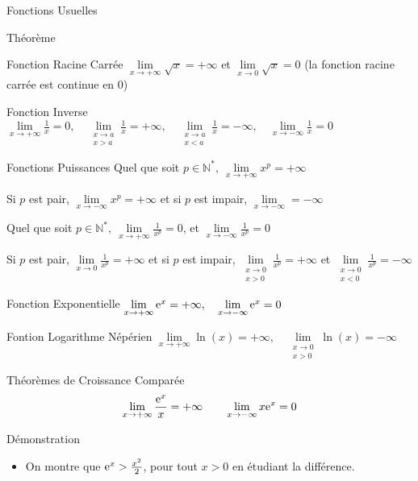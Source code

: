 \documentclass{cours}
\begin{document}
    \begin{Gpartie}{Fonctions Usuelles} 
        \begin{Spartie}{Théorème} 
            \begin{SSpartie}{Fonction Racine Carrée} 
                $\lim\limits_{x\to+\infty}\sqrt{x}=+\infty$ et $\lim\limits_{x\to0}\sqrt{x}=0$ (la fonction racine carrée est continue en $0$)
            \end{SSpartie}
            \begin{SSpartie}{Fonction Inverse} 
                $\lim\limits_{x\to+\infty}\frac{1}{x}=0,\quad\lim\limits_{\substack{x\to a \\ x>a}}\frac{1}{x}=+\infty,\quad\lim\limits_{\substack{x\to a \\ x<a}}\frac{1}{x}=-\infty,\quad\lim\limits_{x\to-\infty}\frac{1}{x}=0$
            \end{SSpartie}
            \begin{SSpartie}{Fonctions Puissances} 
                Quel que soit $p\in\mathbb{N^*},~\lim\limits_{x\to+\infty}x^p=+\infty$

                Si $p$ est pair, $\lim\limits_{x\to-\infty}x^p=+\infty$ et si $p$ est impair, $\lim\limits_{x\to-\infty}=-\infty$
                
                \vspace*{2ex}Quel que soit $p\in\mathbb{N^*},~\lim\limits_{x\to+\infty}\frac{1}{x^p}=0$, et $\lim\limits_{x\to-\infty}\frac{1}{x^p}=0$

                Si $p$ est pair, $\lim\limits_{x\to0}\frac{1}{x^p}=+\infty$ et si $p$ est impair, $\lim\limits_{\substack{x\to0 \\ x>0}}\frac{1}{x^p}=+\infty$ et $\lim\limits_{\substack{x\to0 \\ x<0}}\frac{1}{x^p}=-\infty$
            \end{SSpartie}
            \begin{SSpartie}{Fonction Exponentielle} 
                $\lim\limits_{x\to+\infty}\mathrm{e}^x=+\infty,\quad\lim\limits_{x\to-\infty}\mathrm{e}^x=0$
            \end{SSpartie}
            \begin{SSpartie}{Fontion Logarithme Népérien} 
                $\lim\limits_{x\to+\infty}\ln(x)=+\infty,\quad\lim\limits_{\substack{x\to0 \\ x>0}}\ln(x)=-\infty$
            \end{SSpartie}
        \end{Spartie}
        \begin{Spartie}{Théorèmes de Croissance Comparée} 
            \[\lim\limits_{x\to+\infty}\frac{\mathrm{e}^x}{x}=+\infty\qquad\lim\limits_{x\to-\infty}x\mathrm{e}^x=0\]
            \begin{SSpartie}{Démonstration} 
                \begin{itemize}
                    \item On montre que $\mathrm{e}^x>\frac{x^2}{2}$, pour tout $x>0$ en étudiant la différence.


\end{itemize}
\end{SSpartie}
\end{Spartie}
\end{Gpartie}
\end{document}
